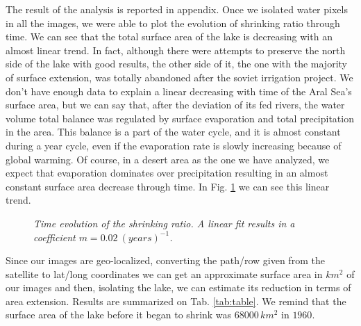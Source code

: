 The result of the analysis is reported in appendix. 
Once we isolated water pixels in all the images, we were able to plot the evolution of shrinking ratio through time. 
We can see that the total surface area of the lake is decreasing with an almost linear trend. 
In fact, although there were attempts to preserve the north side of the lake with good results, the other side of it, the one with the majority of surface extension, was totally abandoned after the soviet irrigation project. 
We don't have enough data to explain a linear decreasing with time of the Aral Sea's surface area, but we can say that, after the deviation of its fed rivers, the water volume total balance was regulated by surface evaporation and total precipitation in the area. 
This balance is a part of the water cycle, and it is almost constant during a year cycle, even if the evaporation rate is slowly increasing because of global warming. 
Of course, in a desert area as the one we have analyzed, we expect that evaporation dominates over precipitation resulting in an almost constant surface area decrease through time.
In Fig. \ref{fig:expo} we can see this linear trend.
\begin{figure}[H]
    \centering
    \scalebox{.7}{}
    \caption{\emph{Time evolution of the shrinking ratio.
                    A linear fit results in a coefficient $m=0.02 \ \left(years\right)^{-1}$.}}
    \label{fig:expo}
\end{figure}
Since our images are geo-localized, converting the path/row given from the satellite to lat/long coordinates we can get an approximate surface area in $km^2$ of our images and then, isolating the lake, we can estimate its reduction in terms of area extension. 
Results are summarized on Tab. \ref{tab:table}. We remind that the surface area of the lake before it began to shrink was $68000\,km^2$ in $1960$.

